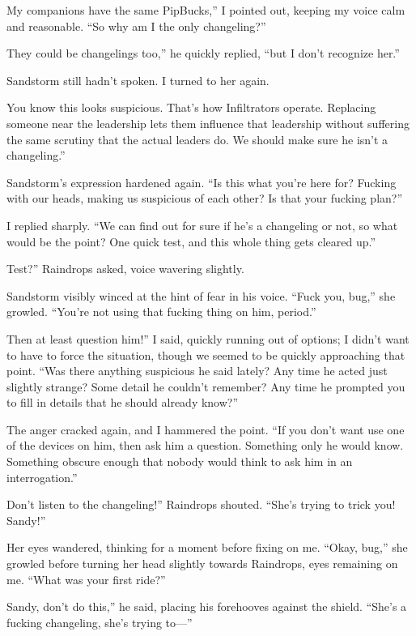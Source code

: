 \leavevmode{}My companions have the same PipBucks,” I pointed out, keeping my voice calm and reasonable. “So why am I the only changeling?”

\leavevmode{}They could be changelings too,” he quickly replied, “but I don’t recognize her.”

Sandstorm still hadn’t spoken. I turned to her again.

\leavevmode{}You know this looks suspicious. That’s how Infiltrators operate. Replacing someone near the leadership lets them influence that leadership without suffering the same scrutiny that the actual leaders do. We should make sure he isn’t a changeling.”

Sandstorm’s expression hardened again. “Is this what you’re here for? Fucking with our heads, making us suspicious of each other? Is that your fucking plan?”

I replied sharply. “We can find out for sure if he’s a changeling or not, so what would be the point? One quick test, and this whole thing gets cleared up.”

\leavevmode{}Test?” Raindrops asked, voice wavering slightly.

Sandstorm visibly winced at the hint of fear in his voice. “Fuck you, bug,” she growled. “You’re not using that fucking thing on him, period.”

\leavevmode{}Then at least question him!” I said, quickly running out of options; I didn’t want to have to force the situation, though we seemed to be quickly approaching that point. “Was there anything suspicious he said lately? Any time he acted just slightly strange? Some detail he couldn’t remember? Any time he prompted you to fill in details that he should already know?”

The anger cracked again, and I hammered the point. “If you don’t want use one of the devices on him, then ask him a question. Something only he would know. Something obscure enough that nobody would think to ask him in an interrogation.”

\leavevmode{}Don’t listen to the changeling!” Raindrops shouted. “She’s trying to trick you! Sandy!”

Her eyes wandered, thinking for a moment before fixing on me. “Okay, bug,” she growled before turning her head slightly towards Raindrops, eyes remaining on me. “What was your first ride?”

\leavevmode{}Sandy, don’t do this,” he said, placing his forehooves against the shield. “She’s a fucking changeling, she’s trying to—”

